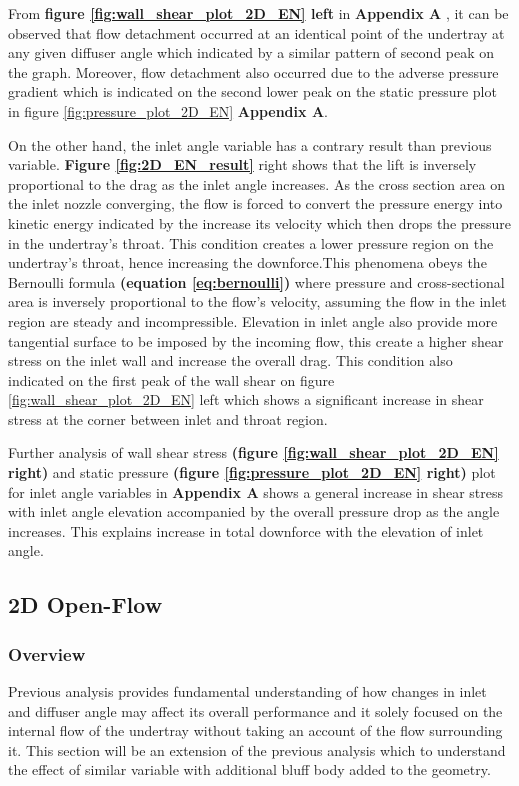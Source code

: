 \noindent From \textbf{figure \ref{fig:wall_shear_plot_2D_EN} left} in \textbf{Appendix A} ,  it can be observed that flow detachment occurred at an identical point of the undertray at any given diffuser angle which indicated by a similar pattern of second peak on the graph. Moreover,  flow detachment also occurred due to the adverse pressure gradient which is indicated on the second lower peak on the static pressure plot in figure \ref{fig:pressure_plot_2D_EN} \textbf{Appendix A}.

\noindent On the other hand, the inlet angle variable has a contrary result than previous variable. \textbf{Figure \ref{fig:2D_EN_result}} right shows that the lift  is inversely proportional to the drag as the inlet angle increases.  As the cross section area on the inlet nozzle converging, the flow is forced to convert the pressure energy into kinetic energy indicated by the increase its velocity which then drops the pressure in the undertray's throat. This condition creates a lower pressure region on the undertray's throat, hence increasing the downforce.This phenomena obeys the Bernoulli formula\textbf{ (equation \ref{eq:bernoulli})} where pressure and cross-sectional area is inversely proportional to the flow's velocity, assuming the flow in the inlet region are steady and incompressible.  Elevation in inlet angle also provide more tangential surface to be imposed by the incoming flow, this create a higher shear stress on the inlet wall and increase the overall drag. This condition also indicated on the first peak of the wall shear on figure \ref{fig:wall_shear_plot_2D_EN} left which shows a significant increase in shear stress at the corner between inlet and throat region.

\noindent Further analysis of wall shear stress \textbf{(figure \ref{fig:wall_shear_plot_2D_EN} right)} and static pressure \textbf{(figure \ref{fig:pressure_plot_2D_EN} right)} plot for inlet angle variables in \textbf{Appendix A} shows a general increase in shear stress with inlet angle elevation accompanied by the overall pressure drop as the angle increases. This explains increase in total downforce with the elevation of inlet angle.



\subsection{2D Open-Flow}
\subsubsection{Overview}
Previous analysis provides fundamental understanding of how changes in inlet and diffuser angle may affect its overall performance and it solely focused on the internal flow of the undertray without taking an account of the flow surrounding it. This section will be an extension of the previous analysis which to understand the effect of similar variable with additional bluff body added to the geometry. 

